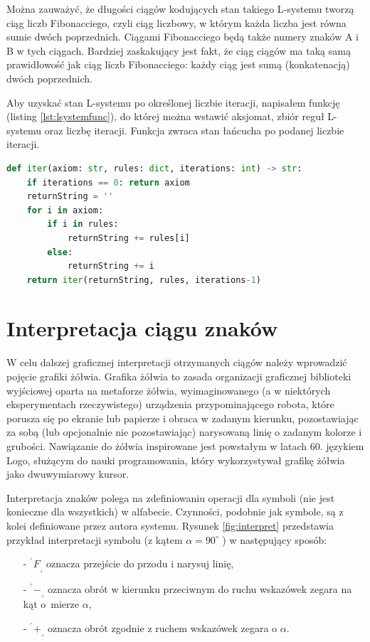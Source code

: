 \documentclass[a4paper,twoside,12pt]{report}
\def\crnrs#1{$^\ulcorner#1_\lrcorner$}
\begin{document}
Można zauważyć, że długości ciągów kodujących stan takiego L-systemu tworzą ciąg liczb Fibonacciego,
czyli ciąg liczbowy, w którym każda liczba jest równa sumie dwóch
poprzednich. Ciągami Fibonacciego będą także numery znaków A i B
w tych ciągach. Bardziej zaskakujący jest fakt, że ciąg ciągów ma
taką samą prawidłowość jak ciąg liczb Fibonacciego: każdy ciąg jest sumą
(konkatenacją) dwóch poprzednich.

Aby uzyskać stan L-systemu po określonej liczbie iteracji, 
napisałem funkcję (listing \ref{lst:lsystemfunc}), do której można wstawić aksjomat, 
zbiór reguł L-systemu oraz liczbę iteracji. 
Funkcja zwraca stan łańcucha po podanej liczbie iteracji.

\begin{lstlisting}[language=Python, caption={Funkcja, która zwraca stan systemu po określonej liczbie iteracji}, label={lst:lsystemfunc}]
def iter(axiom: str, rules: dict, iterations: int) -> str:
	if iterations == 0: return axiom
	returnString = ''
	for i in axiom:
		if i in rules:
			returnString += rules[i]
		else:
			returnString += i
	return iter(returnString, rules, iterations-1)
\end{lstlisting}


\section{Interpretacja ciągu znaków}

W celu dalszej graficznej interpretacji otrzymanych ciągów
należy wprowadzić pojęcie grafiki żółwia. Grafika żółwia
to zasada organizacji graficznej biblioteki wyjściowej oparta 
na metaforze żółwia, wyimaginowanego 
(a w niektórych eksperymentach rzeczywistego) urządzenia 
przypominającego robota, które porusza się po ekranie 
lub papierze i obraca w zadanym kierunku, 
pozostawiając za sobą (lub opcjonalnie nie pozostawiając) 
narysowaną linię o zadanym kolorze i grubości.
Nawiązanie do żółwia inspirowane jest powstałym w latach 60. 
językiem Logo, służącym do nauki programowania, 
który wykorzystywał grafikę żółwia jako dwuwymiarowy kursor.


Interpretacja znaków polega na zdefiniowaniu operacji dla symboli
(nie jest konieczne dla wszystkich) w alfabecie. Czynności, podobnie 
jak symbole, są z kolei definiowane
przez autora systemu. Rysunek \ref{fig:interpret} przedstawia przykład interpretacji
symbolu (z kątem $\alpha = 90^\circ$ ) w następujący sposób:

\begin{itemize}
	\item[-] \crnrs{F} oznacza przejście do przodu i narysuj linię,
	\item[-] \crnrs{-} oznacza obrót w kierunku przeciwnym do ruchu wskazówek zegara na kąt o~mierze $\alpha$,
	\item[-] \crnrs{+} oznacza obrót zgodnie z ruchem wskazówek zegara o $\alpha$.
\end{itemize}
\end{document}
